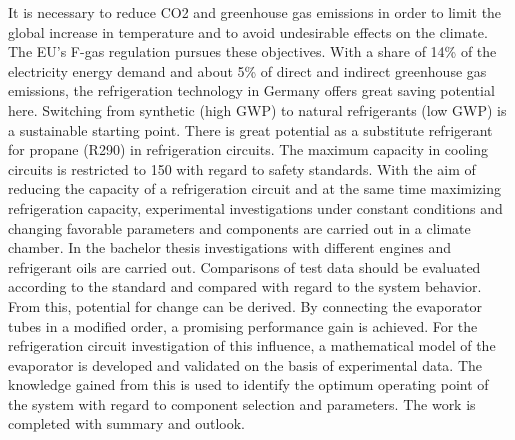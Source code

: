 It is necessary to reduce CO2 and greenhouse gas emissions in order to limit the global increase in temperature and to avoid undesirable effects on the climate. The EU's F-gas regulation pursues these objectives. With a share of \unit{14}{\%} of the electricity energy demand and about \unit{5}{\%} of direct and indirect greenhouse gas emissions, the refrigeration technology in Germany offers great saving potential here. Switching from synthetic (high GWP) to natural refrigerants (low GWP) is a sustainable starting point.
There is great potential as a substitute refrigerant for propane (R290) in refrigeration circuits. The maximum capacity in cooling circuits is restricted to \unit{150}{\gram} with regard to safety standards.
With the aim of reducing the capacity of a refrigeration circuit and at the same time maximizing refrigeration capacity, experimental investigations under constant conditions and changing favorable parameters and components are carried out in a climate chamber.
In the bachelor thesis investigations with different engines and refrigerant oils are carried out. Comparisons of test data should be evaluated according to the standard and compared with regard to the system behavior. From this, potential for change can be derived.
By connecting the evaporator tubes in a modified order, a promising performance gain is achieved. For the refrigeration circuit investigation of this influence, a mathematical model of the evaporator is developed and validated on the basis of experimental data.
The knowledge gained from this is used to identify the optimum operating point of the system with regard to component selection and parameters.
The work is completed with summary and outlook.

